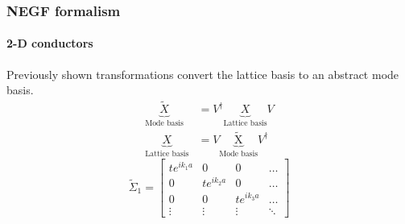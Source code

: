 \documentclass{beamer}
\begin{document}
{

    \begin{frame}
        \frametitle{NEGF formalism}
        \framesubtitle{2-D conductors}
        \scriptsize

Previously shown transformations convert the lattice basis to an abstract mode basis.
\begin{align*}
   \underbrace{\tilde{X}}_\text{Mode basis} &= V^{\dagger} \underbrace{X}_\text{Lattice basis} V \\ 
   \underbrace{X}_\text{Lattice basis} &= V \underbrace{\tilde{\text{X}}}_\text{Mode basis} V^{\dagger}
\end{align*}
\begin{equation*}
    \tilde{\Sigma}_{1} = \begin{bmatrix}
                         te^{ik_{1}a} & 0 & 0 & \ldots \\
                         0 & te^{ik_{2}a} & 0 & \ldots \\
                         0 & 0 & te^{ik_{3}a} & \ldots \\
                         \vdots & \vdots & \vdots & \ddots
                         \end{bmatrix}
\end{equation*}

    \end{frame} 
}
\end{document}
